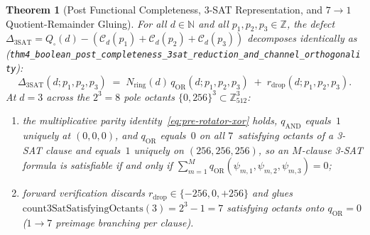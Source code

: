 \documentclass[11pt,a4paper]{article}
\theoremstyle{plain}
\newtheorem{theorem}{Theorem}[section]
\theoremstyle{definition}
\begin{document}
\begin{theorem}[Post Functional Completeness, 3-SAT Representation, and $7\to 1$ Quotient-Remainder Gluing]
\label{thm:main-4}
For all $d\in\mathbb{N}$ and all $p_1,p_2,p_3\in\mathbb{Z}$, the defect $\Delta_{\mathrm{3SAT}} = Q_\square(d) - (\mathcal{C}_d(p_1)+\mathcal{C}_d(p_2)+\mathcal{C}_d(p_3))$ decomposes identically as (\texttt{thm4\_boolean\_post\_completeness\_3sat\_reduction\_and\_channel\_orthogonality}):
\[
  \Delta_{\mathrm{3SAT}}(d;p_1,p_2,p_3) \;=\; N_{\mathrm{ring}}(d)\,q_{\mathrm{OR}}(d;p_1,p_2,p_3) \;+\; r_{\mathrm{drop}}(d;p_1,p_2,p_3).
\]
At $d=3$ across the $2^3=8$ pole octants $\{0,256\}^3\subset\mathbb{Z}_{512}^3$:
\begin{enumerate}[label=\textbf{(\roman*)},leftmargin=*,noitemsep]
\item the multiplicative parity identity~\eqref{eq:pre-rotator-xor} holds, $q_{\mathrm{AND}}$ equals~$1$ uniquely at $(0,0,0)$, and $q_{\mathrm{OR}}$ equals~$0$ on all $7$~satisfying octants of a 3-SAT clause and equals~$1$ uniquely on $(256,256,256)$, so an $M$-clause 3-SAT formula is satisfiable if and only if $\sum_{m=1}^M q_{\mathrm{OR}}(\psi_{m,1},\psi_{m,2},\psi_{m,3}) = 0$;
\item forward verification discards $r_{\mathrm{drop}}\in\{-256,0,+256\}$ and glues $\mathrm{count3SatSatisfyingOctants}(3)=2^3-1=7$ satisfying octants onto $q_{\mathrm{OR}}=0$ ($1\to 7$ preimage branching per clause).
\end{enumerate}
\end{theorem}
\end{document}
